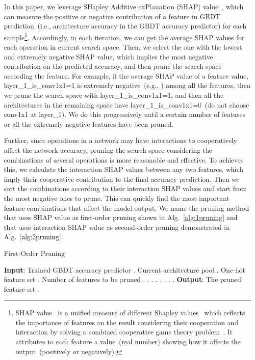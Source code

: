 \documentclass{article}
\begin{document}
In this paper, we leverage SHapley Additive exPlanation (SHAP) value~\cite{unifiedshap}, which can measure the positive or negative contribution of a feature in GBDT prediction~(i.e., architecture accuracy in the GBDT accuracy predictor) for each sample\footnote{SHAP value~\cite{unifiedshap} is a unified measure of different Shapley values~\cite{shapleyregression,shapleysampling,quantinputinfluence} which reflects the importance of features on the result considering their cooperation and interaction by solving a combined cooperative game theory problem~\cite{shapleyvalue}. It attributes to each feature a value~(real number) showing how it affects the output~(positively or negatively).}. Accordingly, in each iteration, we can get the average SHAP values for each operation in current search space. Then, we select the one with the lowest and extremely negative SHAP value, which implies the most negative contribution on the predicted accuracy, and then prune the search space according the feature. For example, if the average SHAP value of a feature value, layer\_1\_is\_conv1x1=1 is extremely negative~(e.g., ) among all the features, then we prune the search space with layer\_1\_is\_conv1x1=1, and then all the architectures in the remaining space have layer\_1\_is\_conv1x1=0~(do not choose conv1x1 at layer\_1). We do this progressively until a certain number of features or all the extremely negative features have been pruned.

Further, since operations in a network may have interactions to cooperatively affect the network accuracy, pruning the search space considering the combinations of several operations is more reasonable and effective. To achieves this, we calculate the interaction SHAP values between any two features, which imply their cooperative contribution to the final accuracy prediction. Then we sort the combinations according to their interaction SHAP values and start from the most negative ones to prune. This can quickly find the most important feature combinations that affect the model output. We name the pruning method that uses SHAP value as first-order pruning shown in Alg.~\ref{alg:1pruning} and that uses interaction SHAP value as second-order pruning demonstrated in Alg.~\ref{alg:2pruning}.

\begin{algorithm}[ht]
\small
\caption{First-Order Pruning}
\label{alg:1pruning}
\begin{algorithmic}[1]
\STATE \textbf{Input}: Trained GBDT accuracy predictor . Current architecture pool . One-hot feature set . Number of features to be pruned .
\STATE .
\STATE .
\STATE {}   .
\FOR {}
\STATE .
\STATE .
\STATE .
\IF{}
\STATE .
\ENDIF
\ENDFOR
\STATE \textbf{Output}: The pruned feature set .
\end{algorithmic}
\end{algorithm}
\end{document}
